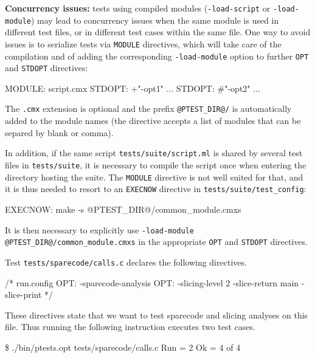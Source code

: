 \begin{important}
  \textbf{Concurrency issues:}
  tests using compiled modules ({\tt -load-script} or {\tt -load-module}) may
  lead to concurrency issues when the same module is used in different test
  files, or in different test cases within the same file. One way to avoid
  issues is to serialize tests via \texttt{MODULE} directives, which will
  take care of the compilation and of adding the corresponding
  \texttt{-load-module} option to further \texttt{OPT} and
  \texttt{STDOPT} directives:

  \begin{listing-nonumber}
    MODULE: script.cmx
    STDOPT: +"-opt1" ...
    STDOPT: #"-opt2" ...
  \end{listing-nonumber}
  The {\tt .cmx} extension is optional and the prefix {\tt @PTEST\_DIR@/}
  is automatically added to the module names (the directive accepts a list
  of modules that can be separed by blank or comma).

  In addition, if the same script {\tt tests/suite/script.ml}
  is shared by several test files in {\tt tests/suite},
  it is necessary to compile the script once
  when entering the directory hosting the suite. The {\tt MODULE} directive is
  not well suited for that, and it is thus needed to resort to an {\tt EXECNOW}
  directive in {\tt tests/suite/test\_config}:

  \begin{listing-nonumber}
    EXECNOW: make -s @PTEST_DIR@/common_module.cmxs
  \end{listing-nonumber}

  It is then necessary to explicitly use
  {\tt -load-module @PTEST\_DIR@/common\_module.cmxs} in the appropriate
  {\tt OPT} and {\tt STDOPT} directives.

\end{important}

\begin{example}
  Test \texttt{tests/sparecode/calls.c} declares the following directives.
\begin{listing-nonumber}
/* run.config
   OPT: -sparecode-analysis
   OPT: -slicing-level 2 -slice-return main -slice-print
*/
\end{listing-nonumber}
These directives state that we want to test sparecode and slicing analyses on
this file. Thus running the following instruction executes two test cases.
\begin{shell}
\$ ./bin/ptests.opt tests/sparecode/calls.c
Run = 2
Ok  = 4 of 4
\end{shell}
\end{example}

